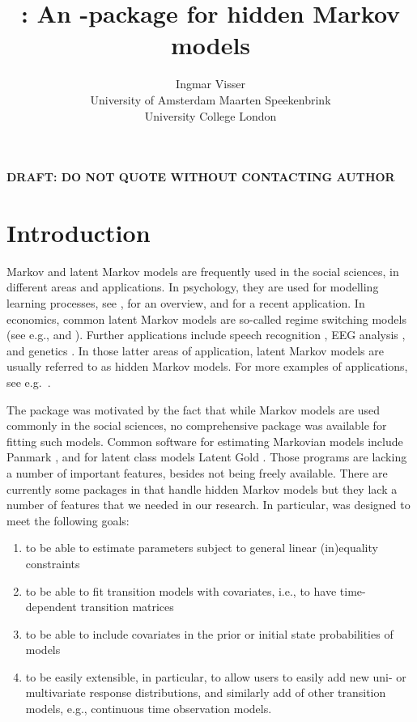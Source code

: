 \documentclass[article]{jss}
\author{Ingmar Visser\\University of Amsterdam \And 
        Maarten Speekenbrink\\University College London}
\title{\pkg{depmixS4} : An \proglang{R}-package for hidden Markov models}
\begin{document}


\begin{center}
\bf{DRAFT: DO NOT QUOTE WITHOUT CONTACTING AUTHOR}
\end{center}

\section{Introduction}

Markov and latent Markov models are frequently used in the social
sciences, in different areas and applications.  In psychology, they
are used for modelling learning processes, see \citet{Wickens1982},
for an overview, and \citet{Schmittmann2006} for a recent application.
In economics, common latent Markov models are so-called regime
switching models (see e.g., \citealp{Kim1994} and \citealp{Ghysels1994}).
Further applications include speech recognition \citep{Rabiner1989},
EEG analysis \citep{Rainer2000}, and genetics \citep{Krogh1998}.  In
those latter areas of application, latent Markov models are usually
referred to as hidden Markov models. For more examples of applications, 
see e.g.\ \citet[][chapter~1]{Cappe2005}.

The  package was motivated by the fact that while Markov
models are used commonly in the social sciences, no comprehensive
package was available for fitting such models.  Common software for 
estimating Markovian models include Panmark \citep{Pol1996}, and for latent class
models Latent Gold \citep{Vermunt2003}.  Those programs are lacking a
number of important features, besides not being freely available.
There are currently some packages in  that handle hidden Markov
models but they lack a number of features that we needed in our
research. In particular,  was designed to meet the
following goals:

\begin{enumerate}
	
	\item to be able to estimate parameters subject to general
	linear (in)equality constraints
	
	\item to be able to fit transition models with covariates, i.e.,
	to have time-dependent transition matrices
	
	\item to be able to include covariates in the prior or initial
	state probabilities of models
	
	\item to be easily extensible, in particular, to allow users to
  easily add new uni- or multivariate response distributions, and similarly 
  add of other transition models, e.g., continuous time observation
	models.
	
\end{enumerate}
\end{document}
